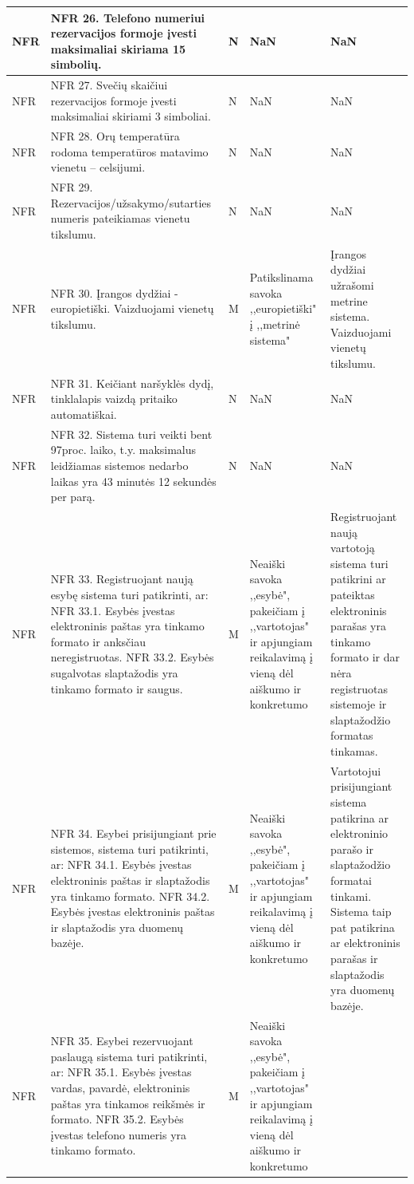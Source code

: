\documentclass[oneside]{VUMIFPSkursinis}
\begin{document}
\begin{longtable}{ | p{}|p{}|p{}|p{}|p{}| }
NFR & NFR 26. Telefono numeriui rezervacijos formoje įvesti maksimaliai skiriama 15 simbolių. & N & NaN & NaN \\ \hline
NFR & NFR 27. Svečių skaičiui rezervacijos formoje įvesti maksimaliai skiriami 3 simboliai. & N & NaN & NaN \\ \hline
NFR & NFR 28. Orų temperatūra rodoma temperatūros matavimo vienetu – celsijumi.  & N & NaN & NaN \\ \hline
NFR & NFR 29. Rezervacijos/užsakymo/sutarties numeris pateikiamas vienetu tikslumu. & N & NaN & NaN \\ \hline
NFR & NFR 30. Įrangos dydžiai - europietiški. Vaizduojami vienetų tikslumu.  & M & Patikslinama savoka ,,europietiški" į ,,metrinė sistema" &  Įrangos dydžiai užrašomi metrine sistema. Vaizduojami vienetų tikslumu. \\ \hline
NFR & NFR 31. Keičiant naršyklės dydį, tinklalapis vaizdą pritaiko automatiškai. & N & NaN & NaN \\ \hline
NFR & NFR 32. Sistema turi veikti bent 97proc. laiko, t.y. maksimalus leidžiamas sistemos nedarbo laikas yra 43 minutės 12 sekundės per parą. & N & NaN & NaN \\ \hline
NFR & NFR 33. Registruojant naują esybę sistema turi patikrinti, ar: 
  NFR 33.1. Esybės įvestas elektroninis paštas yra tinkamo formato ir anksčiau neregistruotas. 
 NFR 33.2. Esybės sugalvotas slaptažodis yra tinkamo formato ir saugus. & M & Neaiški savoka ,,esybė", pakeičiam į ,,vartotojas" ir apjungiam reikalavimą į vieną dėl aiškumo ir konkretumo & Registruojant naują vartotoją sistema turi patikrini ar pateiktas elektroninis parašas yra tinkamo formato ir dar nėra registruotas sistemoje ir slaptažodžio formatas tinkamas. \\ \hline
NFR & NFR 34. Esybei prisijungiant prie sistemos, sistema turi patikrinti, ar: 
 NFR 34.1. Esybės įvestas elektroninis paštas ir slaptažodis yra tinkamo formato. 
 NFR 34.2. Esybės įvestas elektroninis paštas ir slaptažodis yra duomenų bazėje. & M
& Neaiški savoka ,,esybė", pakeičiam į ,,vartotojas" ir apjungiam reikalavimą į vieną dėl aiškumo ir konkretumo & Vartotojui prisijungiant sistema patikrina ar elektroninio parašo ir slaptažodžio formatai tinkami. Sistema taip pat patikrina ar elektroninis parašas ir slaptažodis yra duomenų bazėje. \\ \hline
NFR & NFR 35. Esybei rezervuojant paslaugą sistema turi patikrinti, ar: 
NFR 35.1. Esybės įvestas vardas, pavardė, elektroninis paštas yra tinkamos reikšmės ir formato. 
NFR 35.2. Esybės įvestas telefono numeris yra tinkamo formato. & M & Neaiški savoka ,,esybė", pakeičiam į ,,vartotojas" ir apjungiam reikalavimą į vieną dėl aiškumo ir konkretumo & 

\end{longtable}
\end{document}
